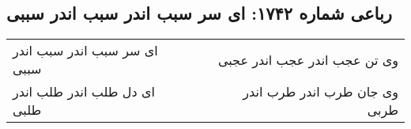 \begin{center}
\section*{رباعی شماره ۱۷۴۲: ای سر سبب اندر سبب اندر سببی}
\label{sec:1742}
\begin{longtable}{l p{0.5cm} r}
ای سر سبب اندر سبب اندر سببی
&&
وی تن عجب اندر عجب اندر عجبی
\\
ای دل طلب اندر طلب اندر طلبی
&&
وی جان طرب اندر طرب اندر طربی
\\
\end{longtable}
\end{center}
